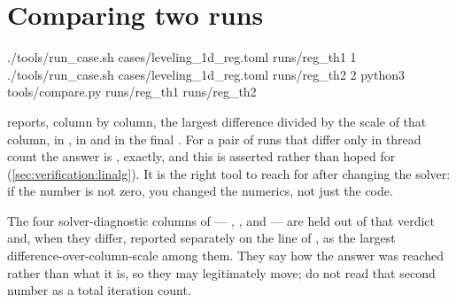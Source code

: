 \section{Comparing two runs}
\label{sec:firstrun:compare}

\begin{shell}
./tools/run_case.sh cases/leveling_1d_reg.toml runs/reg_th1 1
./tools/run_case.sh cases/leveling_1d_reg.toml runs/reg_th2 2
python3 tools/compare.py runs/reg_th1 runs/reg_th2
\end{shell}

 reports, column by column, the largest difference
divided by the scale of that column, in , in
 and in the final . For a pair of runs that
differ only in thread count the answer is , exactly, and this
is asserted rather than hoped for (\cref{sec:verification:linalg}). It is the
right tool to reach for after changing the solver: if the number is not zero,
you changed the numerics, not just the code.

The four solver-diagnostic columns of  --- ,
,  and  --- are held out of
that verdict and, when they differ, reported separately on the line of
, as the largest
difference-over-column-scale among them. They say how the answer was reached
rather than what it is, so they may legitimately move; do not read that second
number as a total iteration count.
